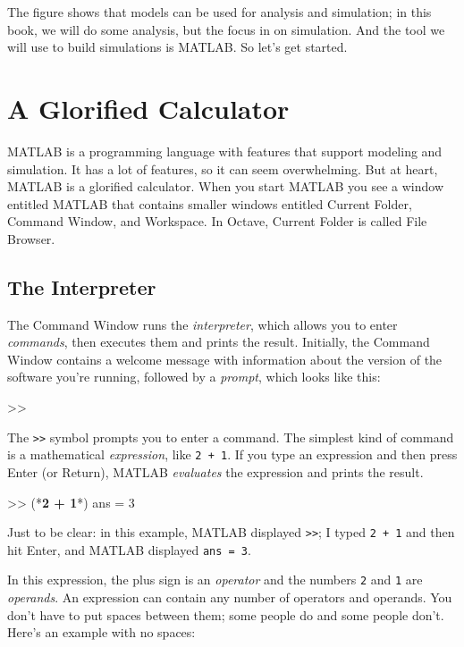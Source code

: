 The figure shows that models can be used for analysis and simulation; in this book, we will do some analysis, but the focus in on simulation.  And the tool we will use to build simulations is MATLAB.  So let's get started.


\section{A Glorified Calculator}
\label{calc}

MATLAB is a programming language with features that support modeling and simulation.  It has a lot of features, so it can seem overwhelming.  But at heart, MATLAB is a glorified calculator.  When you start MATLAB
you see a window
entitled MATLAB that contains smaller windows entitled
Current Folder, Command Window, and Workspace.
In Octave, Current Folder is called File Browser.

\subsection{The Interpreter}
The Command Window runs the \emph{interpreter}, which allows you
to enter \emph{commands}, then executes them and prints the
result. 
Initially, the Command Window contains a welcome message with information
about the version of the software you're running, followed by a \emph{prompt}, which looks like this:

\begin{code}
>>
\end{code}

The \lstinline{>>} symbol prompts you to enter a command. 
The simplest kind of command is a mathematical \emph{expression},
like \lstinline{2 + 1}.
If you type an expression and then press Enter (or Return), MATLAB
\emph{evaluates} the expression and prints the result.

\begin{code}
>> (*\textbf{2 + 1}*)
ans = 3
\end{code}

Just to be clear: in this example, MATLAB displayed \lstinline{>>}; I
typed {\tt 2 + 1} and then hit Enter, and MATLAB displayed \lstinline{ans = 3}.


In this expression, the plus sign is an \emph{operator} and the numbers \lstinline{2} and \lstinline{1} are \emph{operands}.
An expression can contain any number of operators and operands.  You
don't have to put spaces between them; some people do and some people
don't. Here's an example with no spaces:


